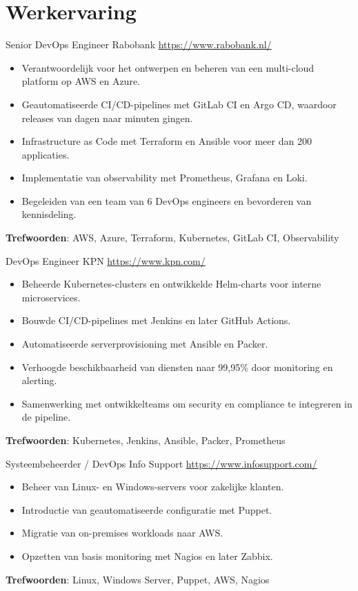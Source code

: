 \documentclass[a4paper, serif, 10pt]{moderncv}
\begin{document}
\section{Werkervaring}

        {Senior DevOps Engineer}
        {Rabobank}
        {\url{https://www.rabobank.nl/}}
        {}
        {\begin{itemize}
\item Verantwoordelijk voor het ontwerpen en beheren van een multi-cloud platform op AWS en Azure.
\item Geautomatiseerde CI/CD-pipelines met GitLab CI en Argo CD, waardoor releases van dagen naar minuten gingen.
\item Infrastructure as Code met Terraform en Ansible voor meer dan 200 applicaties.
\item Implementatie van observability met Prometheus, Grafana en Loki.
\item Begeleiden van een team van 6 DevOps engineers en bevorderen van kennisdeling.
\end{itemize}
\textbf{Trefwoorden}: AWS, Azure, Terraform, Kubernetes, GitLab CI, Observability}

        {DevOps Engineer}
        {KPN}
        {\url{https://www.kpn.com/}}
        {}
        {\begin{itemize}
\item Beheerde Kubernetes-clusters en ontwikkelde Helm-charts voor interne microservices.
\item Bouwde CI/CD-pipelines met Jenkins en later GitHub Actions.
\item Automatiseerde serverprovisioning met Ansible en Packer.
\item Verhoogde beschikbaarheid van diensten naar 99,95\% door monitoring en alerting.
\item Samenwerking met ontwikkelteams om security en compliance te integreren in de pipeline.
\end{itemize}
\textbf{Trefwoorden}: Kubernetes, Jenkins, Ansible, Packer, Prometheus}

        {Systeembeheerder / DevOps}
        {Info Support}
        {\url{https://www.infosupport.com/}}
        {}
        {\begin{itemize}
\item Beheer van Linux- en Windows-servers voor zakelijke klanten.
\item Introductie van geautomatiseerde configuratie met Puppet.
\item Migratie van on-premises workloads naar AWS.
\item Opzetten van basis monitoring met Nagios en later Zabbix.
\end{itemize}
\textbf{Trefwoorden}: Linux, Windows Server, Puppet, AWS, Nagios}
\end{document}

